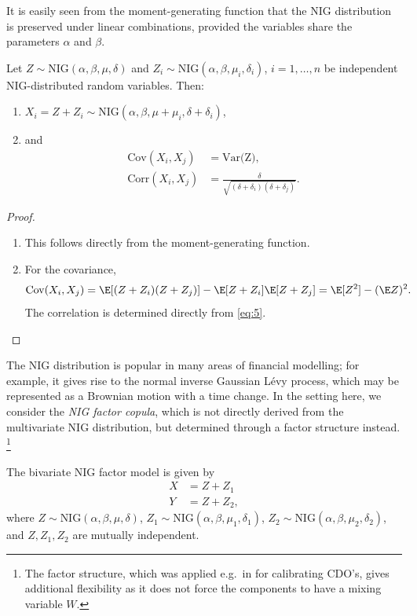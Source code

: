 It is easily seen from the moment-generating function that the NIG distribution is preserved under linear combinations, provided
the variables share the parameters $\alpha$ and $\beta$. 
\begin{prop}
  \label{prop:NIG}
  Let $Z\sim \text{NIG}(\alpha, \beta, \mu, \delta)$ and
  $Z_i\sim \text{NIG}(\alpha, \beta, \mu_i, \delta_i)$,
  $i=1,\ldots, n$ be independent NIG-distributed random
  variables. Then:
  \begin{enumerate}
  \item  $X_i = Z + Z_i\sim \text{NIG}(\alpha,\beta,\mu+\mu_i,
  \delta+\delta_i)$,
\item and 
  \begin{align}
    \text{Cov}(X_i,X_j) &= \text{Var(Z)},\nonumber\\
    \text{Corr}(X_i,X_j) &= \frac{\delta}{\sqrt{(\delta+\delta_i)
                           (\delta+\delta_j)}}. \label{eq:6}
  \end{align}
\end{enumerate}
\end{prop}
\begin{proof}
  \begin{enumerate}
  \item This follows directly from the moment-generating function. 
  \item For the covariance,
    \begin{equation*}
      \text{Cov}(X_i,X_j)
      = \E[(Z+Z_i) (Z+Z_j)] - \E[Z+Z_i] \E[Z+Z_j]
      = \E[Z^2] -(\E Z)^2.
    \end{equation*}
    The correlation is determined directly from \ref{eq:5}.
  \end{enumerate}
\end{proof}

The NIG distribution is popular in many areas of
financial modelling; for example, it gives rise 
to the normal inverse Gaussian L\'evy process, which may be represented
as a Brownian motion with a time change.
In the setting here, we consider the {\em NIG factor copula}, which is
not directly derived from the multivariate NIG distribution, but
determined through a factor structure instead. \footnote{The factor structure,
which was applied e.g.\ in \citep{Kalemanova2007} for calibrating CDO's,
gives additional flexibility as it does not force the components to
have a mixing variable $W$.}

The bivariate NIG factor model is given by
\begin{align*}
  X &= Z + Z_1 \\ 
  Y &= Z + Z_2,
  \end{align*}
where $Z \sim \text{NIG}(\alpha, \beta, \mu, \delta)$, $Z_1 \sim \text{NIG}(\alpha, \beta, \mu_1, \delta_1)$, 
$Z_2 \sim \text{NIG}(\alpha, \beta, \mu_2, \delta_2)$, and $Z, Z_1, Z_2$ are mutually independent. 

